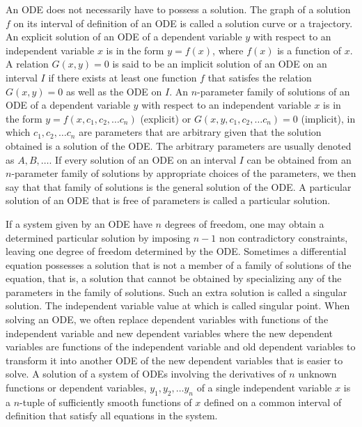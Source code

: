 \documentclass[a4paper,12pt]{report}
\begin{document}
An ODE does not necessarily have to possess a solution.
The graph of a solution $f$ on its interval of definition of an ODE is called a solution curve or a trajectory.
An explicit solution of an ODE of a dependent variable $y$ with respect to an independent variable $x$ is in the form $y=f(x)$, where $f(x)$ is a function of $x$.
A relation $G(x, y) = 0$ is said to be an implicit solution of an ODE on an interval $I$ if there exists at least one function $f$ that satisfes the relation $G(x, y) = 0$ as well as the ODE on $I$.
An $n$-parameter family of solutions of an ODE of a dependent variable $y$ with respect to an independent variable $x$ is in the form $y=f(x,c_1,c_2,\dots c_n)$ (explicit) or $G(x,y,c_1,c_2,\dots c_n)=0$ (implicit), in which $c_1,c_2,\dots c_n$ are parameters that are arbitrary given that the solution obtained is a solution of the ODE. The arbitrary parameters are usually denoted as $A,B,\ldots$.
If every solution of an ODE on an interval $I$ can be obtained from an $n$-parameter family of solutions by appropriate choices of the parameters, we then say that that family of solutions is the general solution of the ODE.
A particular solution of an ODE that is free of parameters is called a particular solution.

If a system given by an ODE have $n$ degrees of freedom, one may obtain a determined particular solution by imposing $n-1$ non contradictory constraints, leaving one degree of freedom determined by the ODE.
Sometimes a differential equation possesses a solution that is not a member of a family of solutions of the equation, that is, a solution that cannot be obtained by specializing any of the parameters in the family of solutions. Such an extra solution is called a singular solution. The independent variable value at which is called singular point.
When solving an ODE, we often replace dependent variables with functions of the independent variable and new dependent variables where the new dependent variables are functions of the independent variable and old dependent variables to transform it into another ODE of the new dependent variables that is easier to solve.
A solution of a system of ODEs involving the derivatives of $n$ unknown functions or dependent variables, $y_1,y_2,\dots y_n$ of a single independent variable $x$ is a $n$-tuple of sufficiently smooth functions of $x$ defined on a common interval of definition that satisfy all equations in the system.
\end{document}
